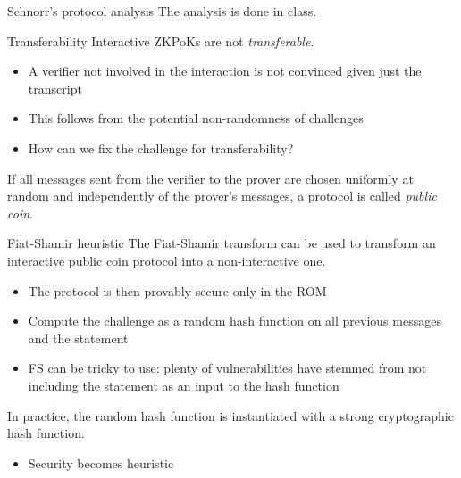\begin{frame}{Schnorr's protocol analysis}
  The analysis is done in class.
\end{frame}

\begin{frame}{Transferability}
  Interactive ZKPoKs are not \emph{transferable}.
  \begin{itemize}
    \item A verifier not involved in the interaction is not convinced given just the transcript
    \item This follows from the potential non-randomness of challenges
    \item How can we fix the challenge for transferability?
  \end{itemize}

  \vspace*{1em}

  \pause
  If all messages sent from the verifier to the prover are chosen uniformly at random and independently of the prover's messages, a protocol is called \emph{public coin}.
\end{frame}

\begin{frame}{Fiat-Shamir heuristic}
  The Fiat-Shamir transform can be used to transform an interactive public coin protocol into a non-interactive one.
  \begin{itemize}[<+(1)->]
    \item The protocol is then provably secure only in the ROM
    \item Compute the challenge as a random hash function on all previous messages and the statement
    \item FS can be tricky to use: plenty of vulnerabilities have stemmed from not including the statement as an input to the hash function
  \end{itemize}

  \pause
  In practice, the random hash function is instantiated with a strong cryptographic hash function.
  \begin{itemize}[<+(1)->]
    \item Security becomes heuristic
  \end{itemize}
\end{frame}


